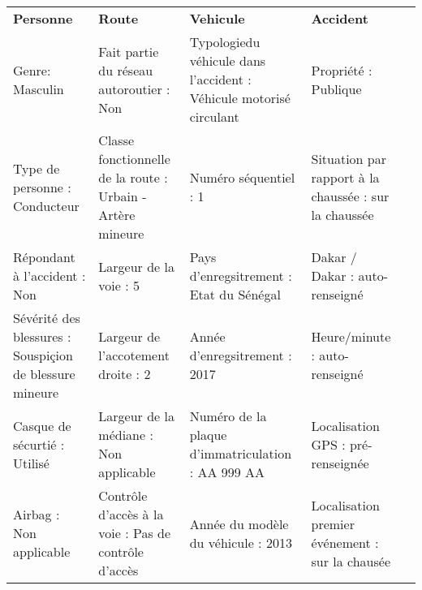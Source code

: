 \documentclass[a4paper,12pt,twoside,french]{book}
[a4paper,12pt,twoside]
\begin{document}
\begin{landscape}
\begin{table}[]
\centering
\begin{adjustbox}{width=2.1\textwidth,center=\textwidth}
\begin{tabular}{|l|l|l|l|l|}
\hline

\textbf{Personne}                                                                            & \textbf{Route}                                             & \textbf{Vehicule}                                                                   & \textbf{Accident}                                     &  \\
Genre: Masculin                                                                              & Fait partie du réseau autoroutier : Non                    & Typologiedu véhicule dans l'accident : Véhicule motorisé circulant                  & Propriété : Publique                                  &  \\
Type de personne : Conducteur                                                                & Classe fonctionnelle de la route : Urbain - Artère mineure & Numéro séquentiel : 1                                                               & Situation par rapport à la chaussée : sur la chaussée &  \\
Répondant à l'accident : Non                                                                 & Largeur de la voie : 5                                     & Pays d'enregsitrement : Etat du Sénégal                                             & Dakar / Dakar : auto-renseigné                        &  \\
Sévérité des blessures : Souspiçion de   blessure mineure                                    & Largeur de l'accotement droite : 2                         & Année d'enregsitrement : 2017                                                       & Heure/minute : auto-renseigné                         &  \\
Casque de sécurtié : Utilisé                                                                 & Largeur de la médiane : Non applicable                     & Numéro de la plaque d'immatriculation : AA 999 AA                                   & Localisation GPS : pré-renseignée                     &  \\
Airbag : Non applicable                                                                      & Contrôle d'accès à la voie : Pas de contrôle d'accès       & Année du modèle du véhicule : 2013                                                  & Localisation premier événement : sur la chausée       &  \\

\end{tabular}
\end{adjustbox}
\end{table}
\end{landscape}
\end{document}
